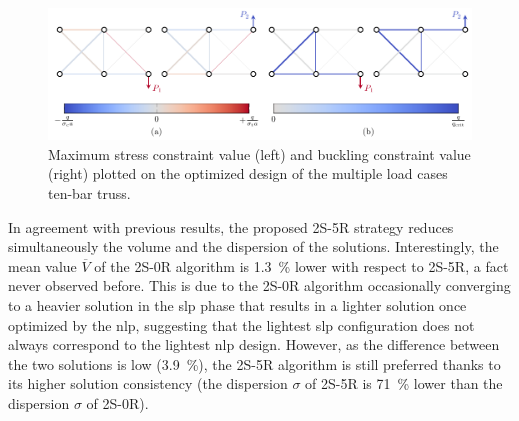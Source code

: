 \begin{figure}
    \centering
    \includegraphics[width=\linewidth]{figures/04_TTO_improvements/19_10_bar_multi_opt/10_bar_multi_opt.pdf}
     \caption{Maximum stress constraint value (left) and buckling constraint value (right) plotted on the optimized design of the multiple load cases ten-bar truss.}
    \label{fig:04_10-bar-bcs-multi-opt}
\end{figure}

In agreement with previous results, the proposed 2S-5R strategy reduces simultaneously the volume and the dispersion of the solutions. Interestingly, the mean value $\overline{V}$ of the 2S-0R algorithm is \qty{1.3}{\%} lower with respect to 2S-5R, a fact never observed before. This is due to the 2S-0R algorithm occasionally converging to a heavier solution in the \gls{slp} phase that results in a lighter solution once optimized by the \gls{nlp}, suggesting that the lightest \gls{slp} configuration does not always correspond to the lightest \gls{nlp} design. However, as the difference between the two solutions is low (\qty{3.9}{\%}), the 2S-5R algorithm is still preferred thanks to its higher solution consistency (the dispersion $\sigma$ of 2S-5R is \qty{71}{\%} lower than the dispersion $\sigma$ of 2S-0R).

